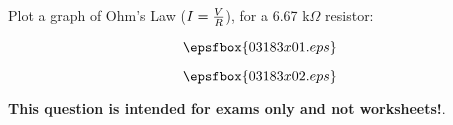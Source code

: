 

Plot a graph of Ohm's Law ($I = {V \over R}$), for a 6.67 k$\Omega$ resistor:

$$\epsfbox{03183x01.eps}$$







$$\epsfbox{03183x02.eps}$$







{\bf This question is intended for exams only and not worksheets!}.





